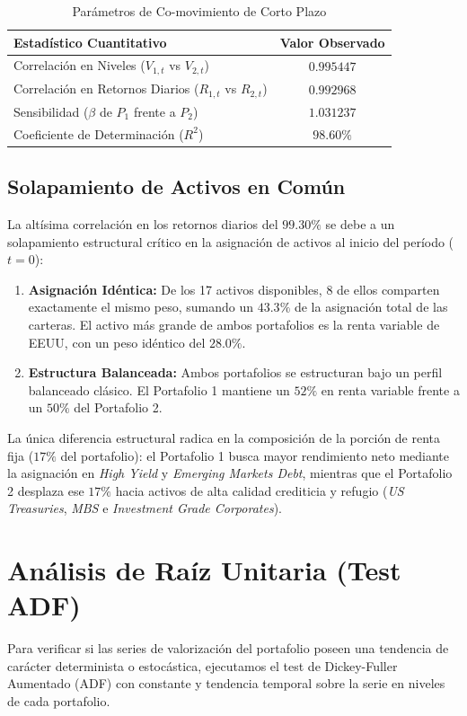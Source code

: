 \documentclass[11pt,a4paper]{article}
\begin{document}
\begin{table}[h]
\centering
\caption{Parámetros de Co-movimiento de Corto Plazo}
\label{tab:correlacion}
\vspace{0.2cm}
\begin{tabular}{lc}
\toprule
\textbf{Estadístico Cuantitativo} & \textbf{Valor Observado} \\
\midrule
Correlación en Niveles ($V_{1,t}$ vs $V_{2,t}$) & $0.995447$ \\
Correlación en Retornos Diarios ($R_{1,t}$ vs $R_{2,t}$) & $0.992968$ \\
Sensibilidad ($\beta$ de $P_1$ frente a $P_2$) & $1.031237$ \\
Coeficiente de Determinación ($R^2$) & $98.60\%$ \\
\bottomrule
\end{tabular}
\end{table}

\subsection{Solapamiento de Activos en Común}
La altísima correlación en los retornos diarios del $99.30\%$ se debe a un solapamiento estructural crítico en la asignación de activos al inicio del período ($t=0$):
\begin{enumerate}
    \item \textbf{Asignación Idéntica:} De los 17 activos disponibles, 8 de ellos comparten exactamente el mismo peso, sumando un \textbf{$43.3\%$} de la asignación total de las carteras. El activo más grande de ambos portafolios es la renta variable de EEUU, con un peso idéntico del \textbf{$28.0\%$}.
    \item \textbf{Estructura Balanceada:} Ambos portafolios se estructuran bajo un perfil balanceado clásico. El Portafolio 1 mantiene un $52\%$ en renta variable frente a un $50\%$ del Portafolio 2.
\end{enumerate}

La única diferencia estructural radica en la composición de la porción de renta fija ($17\%$ del portafolio): el Portafolio 1 busca mayor rendimiento neto mediante la asignación en \textit{High Yield} y \textit{Emerging Markets Debt}, mientras que el Portafolio 2 desplaza ese $17\%$ hacia activos de alta calidad crediticia y refugio (\textit{US Treasuries}, \textit{MBS} e \textit{Investment Grade Corporates}).

\section{Análisis de Raíz Unitaria (Test ADF)}
Para verificar si las series de valorización del portafolio poseen una tendencia de carácter determinista o estocástica, ejecutamos el test de Dickey-Fuller Aumentado (ADF) con constante y tendencia temporal sobre la serie en niveles de cada portafolio.
\end{document}
